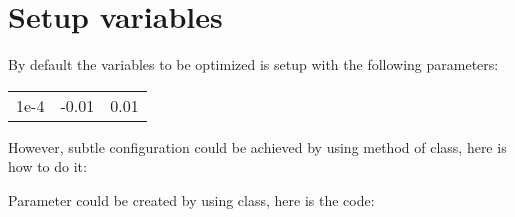 \documentclass[letterpaper,10pt,english]{sphinxmanual}
\begin{document}
\section{Setup variables}
\label{\detokenize{src/demos/demo3:setup-variables}}\label{\detokenize{src/demos/demo3::doc}}
By default the variables to be optimized is setup with the following
parameters:

\noindent\begin{tabulary}{\linewidth}{|L|L|L|}
\hline
{}\relax &\relax &\relax \\
\hline
1e-4
&
-0.01
&
0.01
\\
\hline\end{tabulary}


However, subtle configuration could be achieved by using 
method of  class, here is how to do it:

Parameter could be created by using  class, here is the code:
\end{document}
